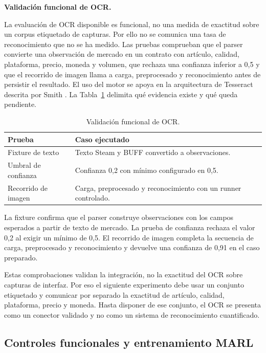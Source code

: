\textbf{Validación funcional de OCR.}

La evaluación de OCR disponible es funcional, no una medida de exactitud sobre un corpus etiquetado de capturas. Por ello no se comunica una tasa de reconocimiento que no se ha medido. Las pruebas comprueban que el parser convierte una observación de mercado en un contrato con artículo, calidad, plataforma, precio, moneda y volumen, que rechaza una confianza inferior a 0,5 y que el recorrido de imagen llama a carga, preprocesado y reconocimiento antes de persistir el resultado. El uso del motor se apoya en la arquitectura de Tesseract descrita por Smith \cite{smith2007tesseract}. La Tabla~\ref{tab:ocr-funcional} delimita qué evidencia existe y qué queda pendiente.

\begin{table}[htbp]
\centering
\begin{tabularx}{\textwidth}{>{\raggedright\arraybackslash}p{} >{\raggedright\arraybackslash}X}
\toprule
Prueba & Caso ejecutado \\
\midrule
Fixture de texto & Texto Steam y BUFF convertido a observaciones. \\
Umbral de confianza & Confianza 0,2 con mínimo configurado en 0,5. \\
Recorrido de imagen & Carga, preprocesado y reconocimiento con un runner controlado. \\
\bottomrule
\end{tabularx}
\caption{Validación funcional de OCR.}
\label{tab:ocr-funcional}
\end{table}

La fixture confirma que el parser construye observaciones con los campos esperados a partir de texto de mercado. La prueba de confianza rechaza el valor 0,2 al exigir un mínimo de 0,5. El recorrido de imagen completa la secuencia de carga, preprocesado y reconocimiento y devuelve una confianza de 0,91 en el caso preparado.

Estas comprobaciones validan la integración, no la exactitud del OCR sobre capturas de interfaz. Por eso el siguiente experimento debe usar un conjunto etiquetado y comunicar por separado la exactitud de artículo, calidad, plataforma, precio y moneda. Hasta disponer de ese conjunto, el OCR se presenta como un conector validado y no como un sistema de reconocimiento cuantificado.

\subsection{Controles funcionales y entrenamiento MARL}

